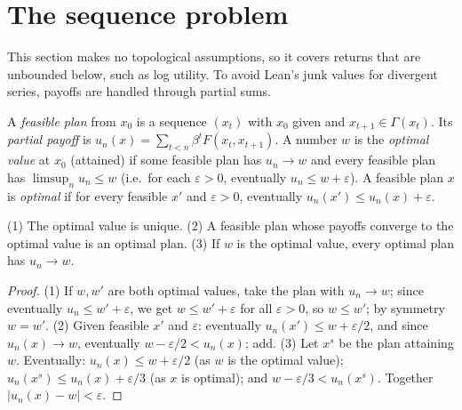 \section{The sequence problem}
\label{sec:sequence}

This section makes no topological assumptions, so it covers returns that are unbounded below, such as
log utility. To avoid Lean's junk values for divergent series, payoffs are handled through partial sums.

\begin{definition}
\label{def:sequence_problem}
\leanok
A \emph{feasible plan} from $x_0$ is a sequence $(x_t)$ with $x_0$ given and $x_{t+1} \in \Gamma(x_t)$.
Its \emph{partial payoff} is $u_n(x) = \sum_{t < n} \beta^t F(x_t, x_{t+1})$.
A number $w$ is the \emph{optimal value} at $x_0$ (attained) if some feasible plan has $u_n \to w$ and
every feasible plan has $\limsup_n u_n \le w$ (i.e.\ for each $\varepsilon > 0$, eventually
$u_n \le w + \varepsilon$). A feasible plan $x$ is \emph{optimal} if for every feasible $x'$ and
$\varepsilon > 0$, eventually $u_n(x') \le u_n(x) + \varepsilon$.
\end{definition}

\begin{lemma}
\label{lem:optimal_value_props}
\leanok
{}
(1) The optimal value is unique. (2) A feasible plan whose payoffs converge to the optimal value is an
optimal plan. (3) If $w$ is the optimal value, every optimal plan has $u_n \to w$.
\end{lemma}
\begin{proof}
\leanok
(1) If $w, w'$ are both optimal values, take the plan with $u_n \to w$; since eventually
$u_n \le w' + \varepsilon$, we get $w \le w' + \varepsilon$ for all $\varepsilon > 0$, so $w \le w'$; by
symmetry $w = w'$.
(2) Given feasible $x'$ and $\varepsilon$: eventually $u_n(x') \le w + \varepsilon/2$, and since
$u_n(x) \to w$, eventually $w - \varepsilon/2 < u_n(x)$; add.
(3) Let $x^s$ be the plan attaining $w$. Eventually: $u_n(x) \le w + \varepsilon/2$ (as $w$ is the
optimal value); $u_n(x^s) \le u_n(x) + \varepsilon/3$ (as $x$ is optimal); and
$w - \varepsilon/3 < u_n(x^s)$. Together $|u_n(x) - w| < \varepsilon$.
\end{proof}

